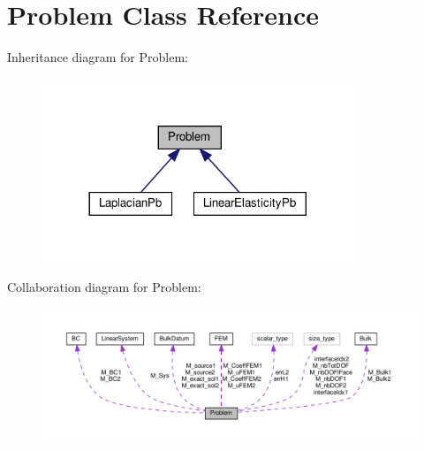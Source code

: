 \hypertarget{classProblem}{}\section{Problem Class Reference}
\label{classProblem}


Inheritance diagram for Problem\+:
\nopagebreak
\begin{figure}[H]
\begin{center}
\leavevmode
\includegraphics[width=264pt]{classProblem__inherit__graph}
\end{center}
\end{figure}


Collaboration diagram for Problem\+:
\nopagebreak
\begin{figure}[H]
\begin{center}
\leavevmode
\includegraphics[width=350pt]{classProblem__coll__graph}
\end{center}
\end{figure}
